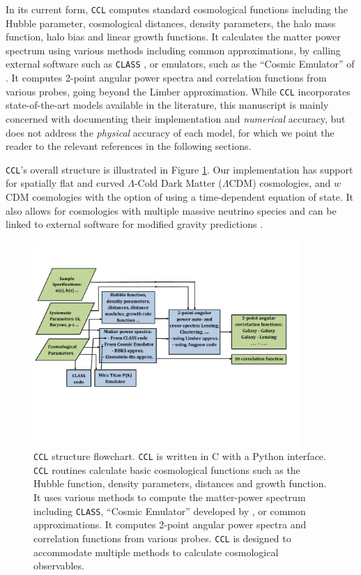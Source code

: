 \documentclass[\docopts]{\docclass}
\newcommand{\ccl}{{\tt CCL}\xspace}
\begin{document}
In its current form, \ccl computes standard cosmological functions including the Hubble parameter, cosmological distances, density parameters, the halo mass function, halo bias and linear growth functions. It calculates the matter power spectrum using various methods including common approximations, by calling external software such as {\tt CLASS} \citep{class}, or emulators, such as the ``Cosmic Emulator'' of \citet{Lawrence17}. It computes 2-point angular power spectra and correlation functions from various probes, going beyond the Limber approximation. While \ccl incorporates state-of-the-art models available in the literature, this manuscript is mainly concerned with documenting their implementation and {\it numerical} accuracy, but does not address the {\it physical} accuracy of each model, for which we point the reader to the relevant references in the following sections. 

\ccl 's overall structure is illustrated in Figure \ref{fig:CCL_structure}. Our implementation has support for spatially flat and curved $\Lambda$-Cold Dark Matter ($\Lambda$CDM) cosmologies, and $w$CDM cosmologies with the option of using a time-dependent equation of state. It also allows for cosmologies with multiple massive neutrino species and can be linked to external software for modified gravity predictions \citep[{\tt hi$\_$CLASS},][]{Zumalacarregui17}.

\begin{figure}
\centering
\includegraphics[width=0.9\textwidth]{CCL_Flowchart4}
\caption{\ccl structure flowchart. \ccl is written in C with a Python interface. \ccl routines calculate basic cosmological functions such as the Hubble function, density parameters, distances and growth function. It uses various methods to compute the matter-power spectrum including {\tt CLASS}, ``Cosmic Emulator'' developed by \citet{Lawrence17}, or common approximations. It computes 2-point angular power spectra and correlation functions from various probes. \ccl is designed to accommodate multiple methods to calculate cosmological observables.}
\label{fig:CCL_structure}
\end{figure}
\end{document}

